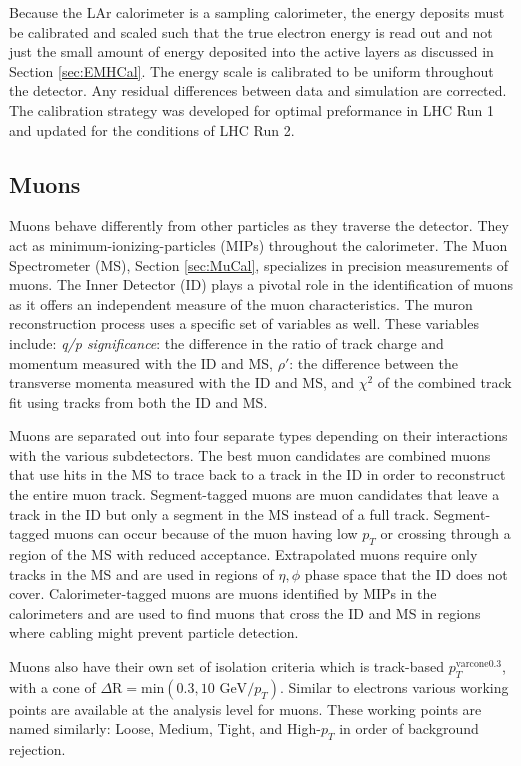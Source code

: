 Because the LAr calorimeter is a sampling calorimeter, the energy deposits must be calibrated and scaled such that the true electron energy is read out and not just the small amount of energy deposited into the active layers as discussed in Section \ref{sec:EMHCal}.  The energy scale is calibrated to be uniform throughout the detector.  Any residual differences between data and simulation are corrected.  The calibration strategy was developed for optimal preformance in LHC Run 1\cite{ElectronCalib1} and updated for the conditions of LHC Run 2\cite{ElectronCalib2}.

\subsection{Muons}
Muons behave differently from other particles as they traverse the detector.  They act as minimum-ionizing-particles (MIPs) throughout the calorimeter.  The Muon Spectrometer (MS), Section \ref{sec:MuCal}, specializes in precision measurements of muons.  The Inner Detector (ID) plays a pivotal role in the identification of muons as it offers an independent measure of the muon characteristics.  The muron reconstruction process uses a specific set of variables as well\cite{MuonID}.  These variables include: \textit{ q/p significance}: the difference in the ratio of track charge and momentum measured with the ID and MS, $\rho'$: the difference between the transverse momenta measured with the ID and MS, and $\chi^2$ of the combined track fit using tracks from both the ID and MS.

Muons are separated out into four separate types depending on their interactions with the various subdetectors.  The best muon candidates are combined muons that use hits in the MS to trace back to a track in the ID in order to reconstruct the entire muon track.  Segment-tagged muons are muon candidates that leave a track in the ID but only a segment in the MS instead of a full track.  Segment-tagged muons can occur because of the muon having low $p_T$ or crossing through a region of the MS with reduced acceptance.  Extrapolated muons require only tracks in the MS and are used in regions of $\eta, \phi$ phase space that the ID does not cover.  Calorimeter-tagged muons are muons identified by MIPs in the calorimeters and are used to find muons that cross the ID and MS in regions where cabling might prevent particle detection.

Muons also have their own set of isolation criteria which is track-based $p_{T}^{\text{varcone0.3}}$, with a cone of $\Delta \text{R} = \text{min}(0.3,10\text{ GeV}/p_T)$.  Similar to electrons various working points are available at the analysis level for muons.  These working points are named similarly: Loose, Medium, Tight, and High-$p_T$ in order of background rejection.  

